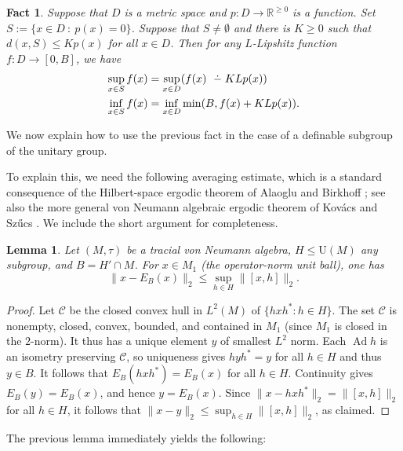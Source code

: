 \documentclass[12pt]{amsart}
\numberwithin{equation}{section}
\newtheorem{lem}[thm]{Lemma}
\newtheorem{fact}[thm]{Fact}
\theoremstyle{definition}
\newcommand{\dminus}{ 
\buildrel\textstyle\ .\over{\hbox{ 
\vrule height3pt depth0pt width0pt}{\smash-} 
}}
\def\bb{\mathbb}
\DeclareMathOperator{\Ad}{Ad}
\begin{document}
\begin{fact}\label{fact:quant}
Suppose that $D$ is a metric space and $p:D\to \bb R^{\geq 0}$ is a function.  Set $S:=\{x\in D \ : \ p(x)=0\}$.  Suppose that $S\not=\emptyset$ and there is $K\geq 0$ such that $d(x,S)\leq Kp(x)$ for all $x\in D$.  Then for any $L$-Lipshitz function $f:D\to [0,B]$, we have
\begin{alignat*}{2}
\sup_{x\in S}f(x)&=\sup_{x\in D} (f(x)\dminus KLp(x))\\
\inf_{x\in S}f(x)&=\inf_{x\in D}\min(B,f(x)+KLp(x)).
\end{alignat*}
\end{fact}

We now explain how to use the previous fact in the case of a definable subgroup of the unitary group.  

To explain this, we need the following averaging estimate, which is a standard
consequence of the Hilbert-space ergodic theorem
of Alaoglu and Birkhoff
\cite{AlaogluBirkhoff1940};
see also the more general von Neumann algebraic
ergodic theorem of Kov\'acs and Sz\H{u}cs
\cite[Theorem~1]{KovacsSzucs66}.
We include the short argument for completeness.

\begin{lem}\label{syn:averaging}
Let $(M,\tau)$ be a tracial von Neumann algebra, $H\leq \mathrm{U}(M)$ any subgroup, and
$B=H'\cap M$. For $x\in M_1$ (the operator-norm unit ball), one has
\[
 \|x-E_B(x)\|_2\leq\sup_{h\in H}\|[x,h]\|_2.
\]
\end{lem}
\begin{proof}
Let $\mathcal C$ be the closed convex hull in $L^2(M)$ of
$\{hxh^*:h\in H\}$. The set $\mathcal C$ is nonempty, closed, convex,
bounded, and contained in $M_1$ (since $M_1$ is closed in the $2$-norm).
It thus has a unique element $y$ of smallest $L^2$ norm. Each $\Ad h$ is an
isometry preserving $\mathcal C$, so uniqueness gives $hyh^*=y$ for all
$h\in H$ and thus $y\in B$. It follows that $E_B(hxh^*)=E_B(x)$ for all $h\in H$.  Continuity gives
$E_B(y)=E_B(x)$, and hence $y=E_B(x)$. Since $\|x-hxh^*\|_2=\|[x,h]\|_2$ for all $h\in H$, it follows that $\|x-y\|_2\leq \sup_{h\in H}\|[x,h]\|_2$, as claimed.
\end{proof}

The previous lemma immediately yields the following:
\end{document}
